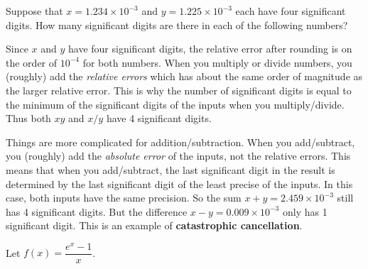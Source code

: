\documentclass[11pt,answers]{exam}
\begin{document}
\begin{questions}
\question Suppose that $x = 1.234 \times 10^{-3}$ and $y = 1.225 \times 10^{-3}$ each have four significant digits.  How many significant digits are there in each of the following numbers? 
\begin{solution}
Since $x$ and $y$ have four significant digits, the relative error after rounding is on the order of $10^{-4}$ for both numbers.  When you multiply or divide numbers, you (roughly) add the \emph{relative errors} which has about the same order of magnitude as the larger relative error.  This is why the number of significant digits is equal to the minimum of the significant digits of the inputs when you multiply/divide. Thus both $xy$ and $x/y$ have 4 significant digits. 

Things are more complicated for addition/subtraction.  When you add/subtract, you (roughly) add the \emph{absolute error} of the inputs, not the relative errors.  This means that when you add/subtract, the last significant digit in the result is determined by the last significant digit of the least precise of the inputs.  In this case, both inputs have the same precision.  So the sum $x+y=2.459 \times 10^{-3}$ still has 4 significant digits.  But the difference $x-y = 0.009 \times 10^{-3}$ only has 1 significant digit.  This is an example of \textbf{catastrophic cancellation}. 
\end{solution}

\question Let $f(x) = \dfrac{e^x - 1}{x}$.  
\end{questions}
\end{document}
